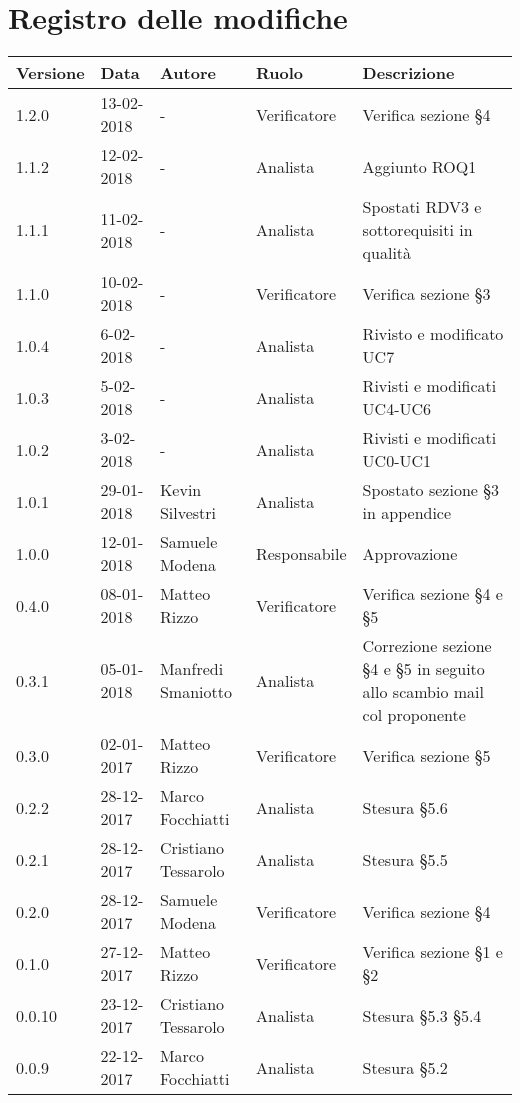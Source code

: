 \documentclass[./AnalisideiRequisiti.tex]{subfiles}
\begin{document}
	
{
	\chapter*{Registro delle modifiche}
\setlength\LTleft{-22mm}
	\begin{longtable}{|p{20mm}|p{20mm}|p{40mm}|p{30mm}|p{50mm}|}
		\hline
		\textbf{Versione} & \textbf{Data} & \textbf{Autore} & \textbf{Ruolo} & \textbf{Descrizione} \\ \hline  
		1.2.0 & 13-02-2018 & - & Verificatore & Verifica sezione §4\\ \hline    
		1.1.2 & 12-02-2018 & - & Analista & Aggiunto ROQ1\\ \hline 
		1.1.1 & 11-02-2018 & - & Analista & Spostati RDV3 e sottorequisiti in qualità\\ \hline  
		1.1.0 & 10-02-2018 & - & Verificatore & Verifica sezione §3\\ \hline  
		1.0.4 & 6-02-2018 & - & Analista & Rivisto e modificato UC7\\ \hline  
		1.0.3 & 5-02-2018 & - & Analista & Rivisti e modificati UC4-UC6\\ \hline    
		1.0.2 & 3-02-2018 & - & Analista & Rivisti e modificati UC0-UC1\\ \hline  
		1.0.1 & 29-01-2018 & Kevin Silvestri & Analista & Spostato sezione §3 in appendice\\ \hline
		1.0.0 & 12-01-2018 & Samuele Modena & Responsabile & Approvazione\\ \hline
		0.4.0 & 08-01-2018 & Matteo Rizzo & Verificatore & Verifica sezione §4 e §5\\ \hline
		0.3.1 & 05-01-2018 & Manfredi Smaniotto & Analista & Correzione sezione §4 e §5 in seguito allo scambio mail col proponente \\ \hline		
		0.3.0 & 02-01-2017 & Matteo Rizzo & Verificatore & Verifica sezione §5\\ \hline
		0.2.2 & 28-12-2017 & Marco Focchiatti & Analista & Stesura §5.6\\ \hline	
		0.2.1 & 28-12-2017 & Cristiano Tessarolo & Analista & Stesura §5.5\\ \hline
	   	0.2.0 & 28-12-2017 & Samuele Modena & Verificatore & Verifica sezione §4\\ \hline
	   	0.1.0 & 27-12-2017 & Matteo Rizzo & Verificatore & Verifica sezione §1 e §2  \\ \hline		
		0.0.10 & 23-12-2017 & Cristiano Tessarolo & Analista & Stesura §5.3 §5.4\\ \hline		
		0.0.9 & 22-12-2017 & Marco Focchiatti & Analista & Stesura §5.2 \\ \hline		

\end{longtable}}
\end{document}
